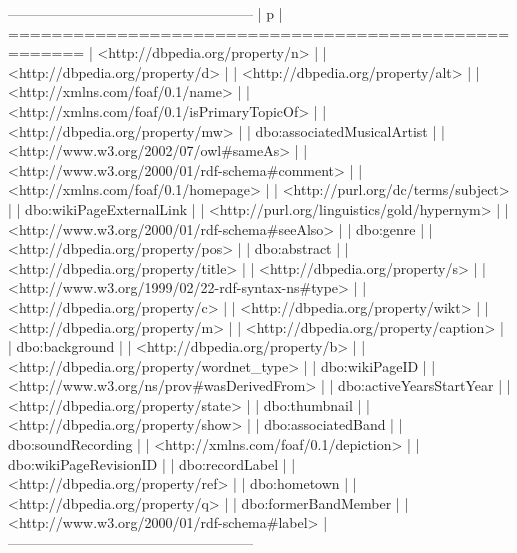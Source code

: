 \documentclass[a4paper, 12pt]{report}
\begin{document}
\begin{messageshell}
-----------------------------------------------------
| p                                                 |
=====================================================
| <http://dbpedia.org/property/n>                   |
| <http://dbpedia.org/property/d>                   |
| <http://dbpedia.org/property/alt>                 |
| <http://xmlns.com/foaf/0.1/name>                  |
| <http://xmlns.com/foaf/0.1/isPrimaryTopicOf>      |
| <http://dbpedia.org/property/mw>                  |
| dbo:associatedMusicalArtist                       |
| <http://www.w3.org/2002/07/owl#sameAs>            |
| <http://www.w3.org/2000/01/rdf-schema#comment>    |
| <http://xmlns.com/foaf/0.1/homepage>              |
| <http://purl.org/dc/terms/subject>                |
| dbo:wikiPageExternalLink                          |
| <http://purl.org/linguistics/gold/hypernym>       |
| <http://www.w3.org/2000/01/rdf-schema#seeAlso>    |
| dbo:genre                                         |
| <http://dbpedia.org/property/pos>                 |
| dbo:abstract                                      |
| <http://dbpedia.org/property/title>               |
| <http://dbpedia.org/property/s>                   |
| <http://www.w3.org/1999/02/22-rdf-syntax-ns#type> |
| <http://dbpedia.org/property/c>                   |
| <http://dbpedia.org/property/wikt>                |
| <http://dbpedia.org/property/m>                   |
| <http://dbpedia.org/property/caption>             |
| dbo:background                                    |
| <http://dbpedia.org/property/b>                   |
| <http://dbpedia.org/property/wordnet_type>        |
| dbo:wikiPageID                                    |
| <http://www.w3.org/ns/prov#wasDerivedFrom>        |
| dbo:activeYearsStartYear                          |
| <http://dbpedia.org/property/state>               |
| dbo:thumbnail                                     |
| <http://dbpedia.org/property/show>                |
| dbo:associatedBand                                |
| dbo:soundRecording                                |
| <http://xmlns.com/foaf/0.1/depiction>             |
| dbo:wikiPageRevisionID                            |
| dbo:recordLabel                                   |
| <http://dbpedia.org/property/ref>                 |
| dbo:hometown                                      |
| <http://dbpedia.org/property/q>                   |
| dbo:formerBandMember                              |
| <http://www.w3.org/2000/01/rdf-schema#label>      |
-----------------------------------------------------
\end{messageshell}
\end{document}
